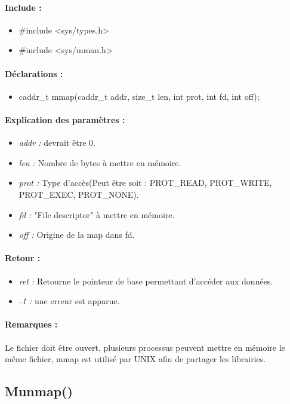 \documentclass{article}[12pt]
\begin{document}
\paragraph{Include : }
\begin{itemize}
	\item \#include <sys/types.h>
	\item \#include <sys/mman.h>
\end{itemize}
\paragraph{Déclarations : }
\begin{itemize}
	\item caddr\_t mmap(caddr\_t addr, size\_t len, int prot, int fd, int off);
\end{itemize}
\paragraph{Explication des paramètres : }
\begin{itemize}
	\item \emph{addr : } devrait être 0.
	\item \emph{len : } Nombre de bytes à mettre en mémoire.
	\item \emph{prot : } Type d'accès(Peut être soit : PROT\_READ, PROT\_WRITE, PROT\_EXEC, PROT\_NONE).
	\item \emph{fd : } "File descriptor" à mettre en mémoire.
	\item \emph{off : } Origine de la map dans fd.
\end{itemize}
\paragraph{Retour : }
\begin{itemize}
	\item \emph{ret : } Retourne le pointeur de base permettant d'accéder aux données.
	\item \emph{-1 : } une erreur est apparue.
\end{itemize}
\paragraph{Remarques : }
Le fichier doit être ouvert, plusieurs processus peuvent mettre en mémoire le même fichier, mmap est utilisé par UNIX afin de partager les librairies.
\subsection{Munmap()}
\end{document}
